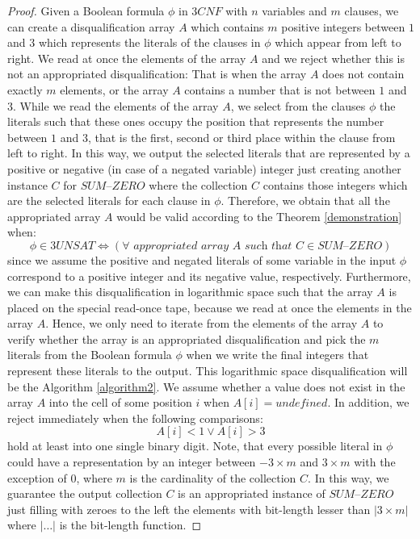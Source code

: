 \documentclass[a4paper,UKenglish,cleveref, autoref]{lipics-v2019}
\begin{document}
\begin{proof}
Given a Boolean formula $\phi$ in $3CNF$ with $n$ variables and $m$ clauses, we can create a disqualification array $A$ which contains $m$ positive integers between $1$ and $3$ which represents the literals of the clauses in $\phi$ which appear from left to right. We read at once the elements of the array $A$ and we reject whether this is not an appropriated disqualification: That is when the array $A$ does not contain exactly $m$ elements, or the array $A$ contains a number that is not between $1$ and $3$. While we read the elements of the array $A$, we select from the clauses $\phi$ the literals such that these ones occupy the position that represents the number between $1$ and $3$, that is the first, second or third place within the clause from left to right. In this way, we output the selected literals that are represented by a positive or negative (in case of a negated variable) integer just creating another instance $C$ for $\textit{SUM--ZERO}$ where the collection $C$ contains those integers which are the selected literals for each clause in $\phi$. Therefore, we obtain that all the appropriated array $A$ would be valid according to the Theorem \ref{demonstration} when:
\[\phi \in 3UNSAT \Leftrightarrow (\forall \textit{ appropriated array } A \textit{ such that } C \in \textit{SUM--ZERO})\]
since we assume the positive and negated literals of some variable in the input $\phi$ correspond to a positive integer and its negative value, respectively. Furthermore, we can make this disqualification in logarithmic space such that the array $A$ is placed on the special read-once tape, because we read at once the elements in the array $A$. Hence, we only need to iterate from the elements of the array $A$ to verify whether the array is an appropriated disqualification and pick the $m$ literals from the Boolean formula $\phi$ when we write the final integers that represent these literals to the output. This logarithmic space disqualification will be the Algorithm \ref{algorithm2}. We assume whether a value does not exist in the array $A$ into the cell of some position $i$ when $A[i] = \textit{undefined}$. In addition, we reject immediately when the following comparisons:
\[A[i] < 1 \vee A[i] > 3\]
hold at least into one single binary digit. Note, that every possible literal in $\phi$ could have a representation by an integer between $-3 \times m$ and $3 \times m$ with the exception of $0$, where $m$ is the cardinality of the collection $C$. In this way, we guarantee the output collection $C$ is an appropriated instance of $\textit{SUM--ZERO}$ just filling with zeroes to the left the elements with bit-length lesser than $|3 \times m|$ where $|\ldots|$ is the bit-length function.


\end{proof}
\end{document}
